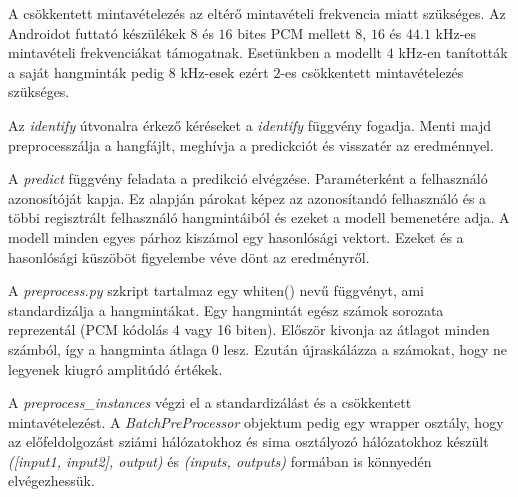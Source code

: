 A csökkentett mintavételezés az eltérő mintavételi frekvencia miatt szükséges. Az Androidot futtató készülékek $8$ és $16$ bites PCM mellett $8$, $16$ és $44.1$ kHz-es mintavételi frekvenciákat támogatnak. Esetünkben a modellt $4$ kHz-en tanították a saját hangminták pedig $8$ kHz-esek ezért $2$-es csökkentett mintavételezés szükséges.

Az \emph{identify} útvonalra érkező kéréseket a \emph{identify} függvény fogadja. Menti majd preprocesszálja a hangfájlt, meghívja a predickciót és visszatér az eredménnyel.

A \emph{predict} függvény feladata a predikció elvégzése. Paraméterként a felhasználó azonosítóját kapja. Ez alapján párokat képez az azonosítandó felhasználó és a többi regisztrált felhasználó hangmintáiból és ezeket a modell bemenetére adja. A modell minden egyes párhoz kiszámol egy hasonlósági vektort. Ezeket és a hasonlósági küszöböt figyelembe véve dönt az eredményről.
\newline

A \emph{preprocess.py} szkript tartalmaz egy whiten() nevű függvényt, ami standardizálja a hangmintákat. Egy hangmintát egész számok sorozata reprezentál (PCM kódolás 4 vagy 16 biten). Először kivonja az átlagot minden számból, így a hangminta átlaga 0 lesz. Ezután újraskálázza a számokat, hogy ne legyenek kiugró amplitúdó értékek.

A \emph{preprocess\_instances} végzi el a standardizálást és a csökkentett mintavételezést. A \emph{BatchPreProcessor} objektum pedig egy wrapper osztály, hogy az előfeldolgozást sziámi hálózatokhoz és sima osztályozó hálózatokhoz készült \emph{([input1, input2], output)} és \emph{(inputs, outputs)} formában is könnyedén elvégezhessük.